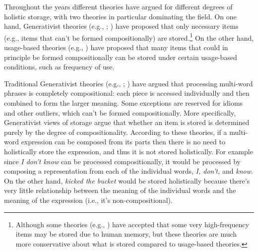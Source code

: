 \documentclass[
  12pt,
  letterpaper,
]{scrreport}
\begin{document}
Throughout the years different theories have argued for different
degrees of holistic storage, with two theories in particular dominating
the field. On one hand, Generativist theories (e.g.,
;
) have proposed that
only necessary items (e.g., items that can't be formed compositionally)
are stored.\footnote{Although some theories (e.g.,
  ) have accepted that
  some very high-frequency items may be stored due to human memory, but
  these theories are much more conservative about what is stored
  compared to usage-based theories.} On the other hand, usage-based
theories (e.g., ) have proposed
that many items that could in principle be formed compositionally can be
stored under certain usage-based conditions, such as frequency of use.

Traditional Generativist theories (e.g.,
;
) have argued that
processing multi-word phrases is completely compositional: each piece is
accessed individually and then combined to form the larger meaning. Some
exceptions are reserved for idioms and other outliers, which can't be
formed compositionally. More specifically, Generativist views of storage
argue that whether an item is stored is determined purely by the degree
of compositionality. According to these theories, if a multi-word
expression can be composed from its parts then there is no need to
holistically store the expression, and thus it is not stored
holistically. For example since \emph{I don't know} can be processed
compositionally, it would be processed by composing a representation
from each of the individual words, \emph{I, don't,} and \emph{know}. On
the other hand, \emph{kicked the bucket} would be stored holistically
because there's very little relationship between the meaning of the
individual words and the meaning of the expression (i.e., it's
non-compositional).
\end{document}
